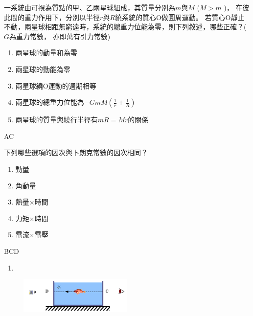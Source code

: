 \documentclass[cn,10pt,math=newtx,chinesefont=founder]{elegantbook}
\begin{document}
\begin{example}
    一系統由可視為質點的甲、乙兩星球組成，其質量分別為$m$與$M$ ($M > m$ )，
    在彼此間的重力作用下，分別以半徑$r$與$R$繞系統的質心O做圓周運動。
    若質心O靜止不動，兩星球相距無窮遠時，系統的總重力位能為零，則下列敘述，哪些正確？($G$為重力常數，
    亦即萬有引力常數)
    \begin{enumerate}[label=(\Alph*)]
        \item 兩星球的動量和為零
        \item 兩星球的動能為零
        \item 兩星球繞O運動的週期相等
        \item 兩星球的總重力位能為$-GmM(\frac{1}{r}+\frac{1}{R})$
        \item 兩星球的質量與繞行半徑有$mR = Mr$的關係
    \end{enumerate}
    \rightline{[94指考]}
\end{example}
\begin{solution}
    AC
\end{solution}
\newpage

\begin{example}
    下列哪些選項的因次與卜朗克常數的因次相同？
    \begin{enumerate}[label=(\Alph*)]
        \item 動量
        \item 角動量
        \item 熱量$\times$時間 
        \item 力矩$\times$時間     
        \item 電流$\times$電壓
    \end{enumerate}
    \rightline{[94指考]}
\end{example}
\begin{solution}
    BCD
\end{solution}
\newpage


\begin{example}
    \begin{enumerate}[label=(\Alph*)]
        \item 
    \end{enumerate}
    \rightline{[指考]}
\end{example}
\begin{solution}
    
\end{solution}
\begin{figure}[htbp]
    \flushright
    \includegraphics[width=0.5\textwidth]{image/93_13.png}
\end{figure}
\newpage
\end{document}

